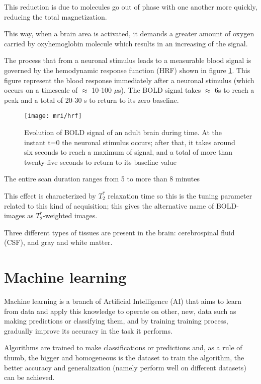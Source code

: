 \documentclass[10pt]{report}
\begin{document}
This reduction is due to molecules go out of phase with one another more quickly, reducing the total magnetization.

This way, when a brain area is activated, it demands a greater amount of oxygen carried by oxyhemoglobin molecule which results in an increasing of the signal.


The process that from a neuronal stimulus leads to a measurable blood signal is governed by the hemodynamic response function (HRF) shown in figure \ref{fig:hrf}. This figure represent the blood response immediately after a neuronal stimulus (which occurs on a timescale of $\approx$ 10-100 $\mu$s). The BOLD signal takes $\approx$ 6s to reach a peak and a total of 20-30 s to return to its zero baseline.

\begin{figure}[h]
\centering
\texttt{[image: mri/hrf]}
\caption{Evolution of BOLD signal of an adult brain during time. At the instant t=0 the neuronal stimulus occurs; after that, it takes around six seconds to reach a maximum of signal, and a total of more than twenty-five seconds to return to its baseline value}
\label{fig:hrf}
\end{figure}

The entire scan duration ranges from 5 to more than 8 minutes



This effect is characterized by $T_2^{\ast}$ relaxation time so this is the tuning parameter related to this kind of acquisition; this gives the alternative name of BOLD-images as $T_2^{\ast}$-weighted images.

Three different types of tissues are present in the brain: cerebrospinal fluid (CSF), and gray and white matter.

\chapter{Machine learning}

Machine learning is a branch of Artificial Intelligence (AI) that aims to learn from data and apply this knowledge to operate on other, new, data such as making predictions or classifying them, and by training training process, gradually improve its accuracy in the task it performs.

Algorithms are trained to make classifications or predictions and, as a rule of thumb, the bigger and homogeneous is the dataset to train the algorithm, the better accuracy and generalization (namely perform well on different datasets) can be achieved.
\end{document}
